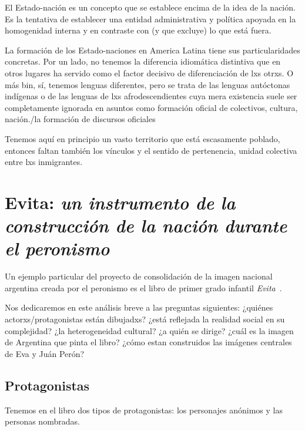 \documentclass[
10pt, %
a4paper, %
oneside, %
headinclude,footinclude, %
]{scrartcl}
\begin{document}
El Estado-nación es un concepto que se establece encima de la idea de la nación.
Es la tentativa de establecer una entidad administrativa y política apoyada en la homogenidad interna y en contraste con (y que excluye) lo que está fuera.

La formación de los Estado-naciones en America Latina tiene sus particularidades concretas.
Por un lado, no tenemos la diferencia idiomática distintiva que en otros lugares ha servido como el factor decisivo de diferenciación de lxs otrxs.
O más bin, sí, tenemos lenguas diferentes, pero se trata de las lenguas autóctonas indígenas o de las lenguas de lxs afrodescendientes cuya mera existencia suele ser completamente ignorada en asuntos como formación oficial de colectivos, cultura, nación./la formación de discursos oficiales

Tenemos aquí en principio un vasto territorio que está escasamente poblado, entonces faltan también los vínculos y el sentido de pertenencia, unidad colectiva entre lxs inmigrantes.

\section{Evita: \emph{un instrumento de la construcción de la nación durante el peronismo}}

Un ejemplo particular del proyecto de consolidación de la imagen nacional argentina creada por el peronismo es el libro de primer grado infantil \textit{Evita}~\autocite{Albornoz1952}.

Nos dedicaremos en este análisis breve a las preguntas siguientes:
¿quiénes actorxs/protagonistas están dibujadxs?
¿está reflejada la realidad social en su complejidad?
¿la heterogeneidad cultural?
¿a quién se dirige?
¿cuál es la imagen de Argentina que pinta el libro?
¿cómo estan construidos las imágenes centrales de Eva y Juán Perón?

\subsection{Protagonistas}

Tenemos en el libro dos tipos de protagonistas: los personajes anónimos y las personas nombradas.
\end{document}
